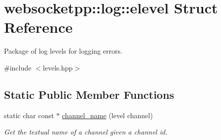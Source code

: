 \hypertarget{structwebsocketpp_1_1log_1_1elevel}{}\section{websocketpp\+:\+:log\+:\+:elevel Struct Reference}
\label{structwebsocketpp_1_1log_1_1elevel}


Package of log levels for logging errors.  




{\ttfamily \#include $<$levels.\+hpp$>$}

\subsection*{Static Public Member Functions}
\begin{DoxyCompactItemize}
\item 
static char const  $\ast$ \hyperlink{structwebsocketpp_1_1log_1_1elevel_ac8eb65399a2ea6b782e0265a44618c0e}{channel\+\_\+name} (level channel)
\begin{DoxyCompactList}\small\item\em Get the textual name of a channel given a channel id. \end{DoxyCompactList}\end{DoxyCompactItemize}
